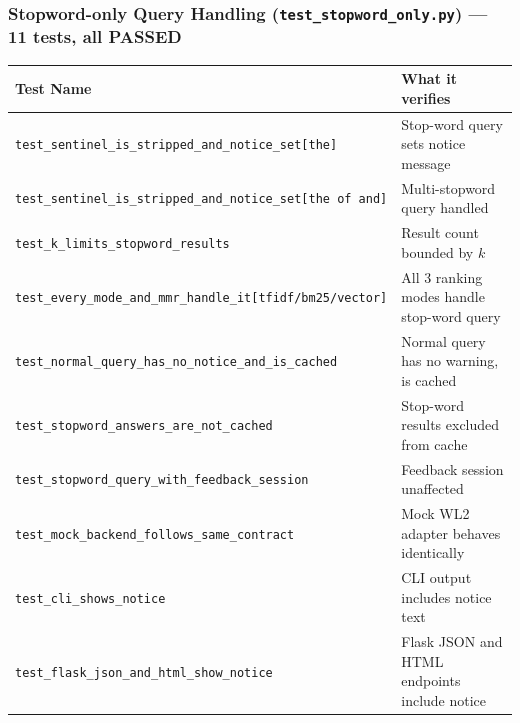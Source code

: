 \documentclass[12pt]{article}
\begin{document}
\subsubsection*{Stopword-only Query Handling (\texttt{test\_stopword\_only.py}) --- 11 tests, all PASSED}
\begin{table}[H]
\centering
\footnotesize
\begin{tabular}{|p{8cm}|p{6.5cm}|}
\hline
\textbf{Test Name} & \textbf{What it verifies} \\
\hline
\texttt{test\_sentinel\_is\_stripped\_and\_notice\_set[the]}         & Stop-word query sets notice message \\
\texttt{test\_sentinel\_is\_stripped\_and\_notice\_set[the of and]}  & Multi-stopword query handled \\
\texttt{test\_k\_limits\_stopword\_results}                          & Result count bounded by $k$ \\
\texttt{test\_every\_mode\_and\_mmr\_handle\_it[tfidf/bm25/vector]}  & All 3 ranking modes handle stop-word query \\
\texttt{test\_normal\_query\_has\_no\_notice\_and\_is\_cached}       & Normal query has no warning, is cached \\
\texttt{test\_stopword\_answers\_are\_not\_cached}                   & Stop-word results excluded from cache \\
\texttt{test\_stopword\_query\_with\_feedback\_session}              & Feedback session unaffected \\
\texttt{test\_mock\_backend\_follows\_same\_contract}                & Mock WL2 adapter behaves identically \\
\texttt{test\_cli\_shows\_notice}                                     & CLI output includes notice text \\
\texttt{test\_flask\_json\_and\_html\_show\_notice}                  & Flask JSON and HTML endpoints include notice \\
\hline
\end{tabular}
\end{table}
\end{document}
